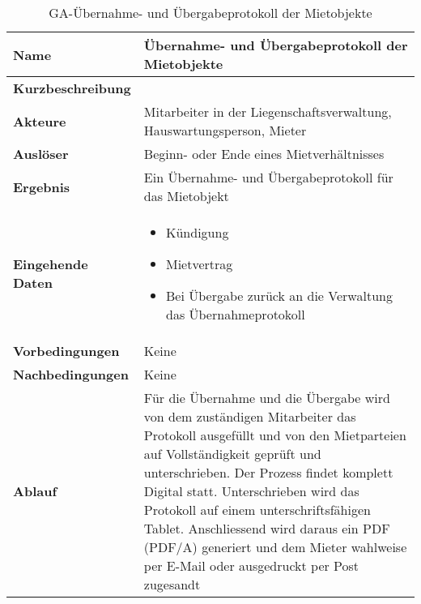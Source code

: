 \begin{table}[H]
  \centering
  \settowidth{}
  \setlength\extrarowheight{2pt}
  \begin{tabulary}{1.0\textwidth}{|a|m{12cm}|}
    \hline
    \textbf{Name}& Übernahme- und Übergabeprotokoll der Mietobjekte\\
    \hline 
    \textbf{Kurzbeschreibung} &\\
    \hline
    \textbf{Akteure} & Mitarbeiter in der Liegenschaftsverwaltung, Hauswartungsperson, Mieter\\
    \hline
    \textbf{Auslöser} & Beginn- oder Ende eines Mietverhältnisses\\
    \hline
    \textbf{Ergebnis} & Ein Übernahme- und Übergabeprotokoll für das Mietobjekt\\
    \hline
    \textbf{Eingehende Daten} &  
    \begin{itemize}
      \item Kündigung
      \item Mietvertrag
      \item Bei Übergabe zurück an die Verwaltung das Übernahmeprotokoll
    \end{itemize}\\
    \hline
    \textbf{Vorbedingungen} & Keine\\
    \hline
    \textbf{Nachbedingungen} & Keine\\
    \hline
    \textbf{Ablauf} & Für die Übernahme und die Übergabe wird von dem zuständigen Mitarbeiter das Protokoll ausgefüllt und von den Mietparteien auf Vollständigkeit geprüft und unterschrieben. Der Prozess findet komplett Digital statt. Unterschrieben wird das Protokoll auf einem unterschriftsfähigen Tablet. Anschliessend wird daraus ein PDF (PDF/A) generiert und dem Mieter wahlweise per E-Mail oder ausgedruckt per Post zugesandt\\
    \hline
  \end{tabulary}
  \caption{GA-Übernahme- und Übergabeprotokoll der Mietobjekte}
\end{table}

